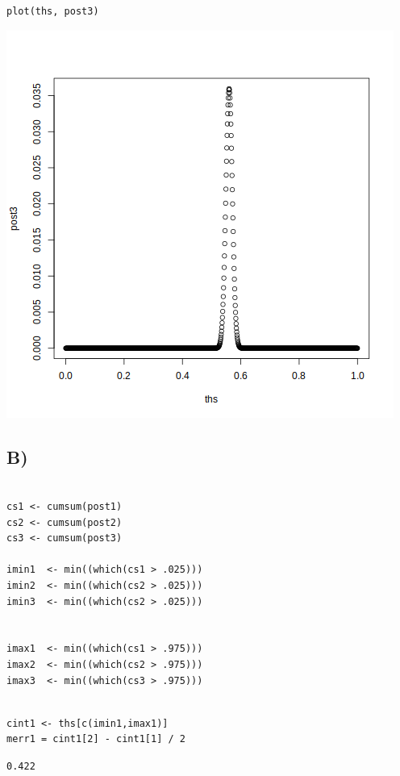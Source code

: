 \documentclass[11pt]{article}
\begin{document}
\begin{verbatim}
plot(ths, post3)
\end{verbatim}

\begin{center}
\includegraphics[width=.9\linewidth]{2000.png}
\end{center}


\subsection*{B)}
\label{sec:orgdc2f144}

\begin{verbatim}

cs1 <- cumsum(post1)
cs2 <- cumsum(post2)
cs3 <- cumsum(post3)

imin1  <- min((which(cs1 > .025)))
imin2  <- min((which(cs2 > .025)))
imin3  <- min((which(cs2 > .025)))


imax1  <- min((which(cs1 > .975)))
imax2  <- min((which(cs2 > .975)))
imax3  <- min((which(cs3 > .975)))


\end{verbatim}


\begin{verbatim}
cint1 <- ths[c(imin1,imax1)]
merr1 = cint1[2] - cint1[1] / 2
\end{verbatim}
\begin{verbatim}
0.422
\end{verbatim}
\end{document}

